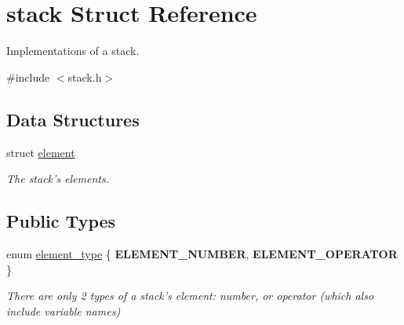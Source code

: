 \hypertarget{structstack}{\section{stack Struct Reference}
\label{structstack}
}


Implementations of a stack.  




{\ttfamily \#include $<$stack.\-h$>$}

\subsection*{Data Structures}
\begin{DoxyCompactItemize}
\item 
struct \hyperlink{structstack_1_1element}{element}
\begin{DoxyCompactList}\small\item\em The stack's elements. \end{DoxyCompactList}\end{DoxyCompactItemize}
\subsection*{Public Types}
\begin{DoxyCompactItemize}
\item 
enum \hyperlink{structstack_a1c66260caf993024c96c0db098f18088}{element\-\_\-type} \{ {\bfseries E\-L\-E\-M\-E\-N\-T\-\_\-\-N\-U\-M\-B\-E\-R}, 
{\bfseries E\-L\-E\-M\-E\-N\-T\-\_\-\-O\-P\-E\-R\-A\-T\-O\-R}
 \}
\begin{DoxyCompactList}\small\item\em There are only 2 types of a stack's element\-: number, or operator (which also include variable names) \end{DoxyCompactList}\end{DoxyCompactItemize}
